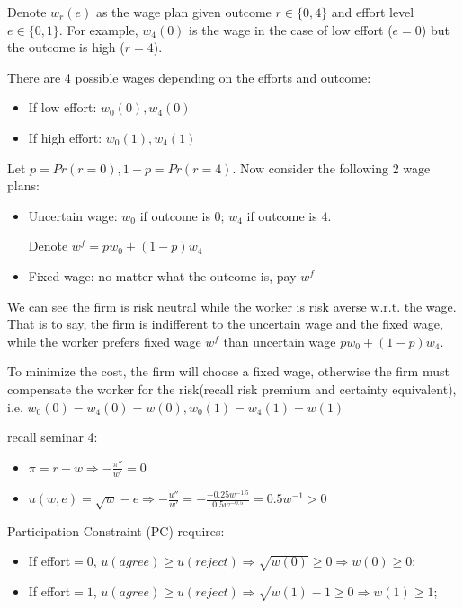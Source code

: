 \documentclass{article}
\begin{document}
\bigskip

Denote $w_r(e)$ as the wage plan given outcome $r \in \{0,4\}$
and effort level $e\in \{0,1\}$. For example, $w_4(0)$ is the wage in the case of low effort ($e=0$) but the outcome is high ($r=4$).

\medskip

There are 4 possible wages depending on the efforts and outcome:

\begin{itemize}
\item If low effort: $w_0(0),w_4(0)$
\item If high effort: $w_0(1),w_4(1)$
\end{itemize}

Let $p = Pr(r=0), 1-p = Pr(r=4)$. Now consider the following 2 wage plans:

\begin{itemize}
\item Uncertain wage: $w_0$ if outcome is $0$; $w_4$ if outcome is $4$.

Denote $w^f = pw_0 +(1-p)w_4$
\item Fixed wage: no matter what the outcome is, pay $w^f$
\end{itemize}


We can see the firm is risk neutral while the worker is risk averse w.r.t. the wage. That is to say, the firm is indifferent to the uncertain wage and the fixed wage, while the worker prefers fixed wage $w^f$ than uncertain wage $pw_0 +(1-p)w_4$.

\medskip

To minimize the cost, the firm will choose a fixed wage, otherwise the firm must compensate the worker for the risk(recall risk premium and certainty equivalent), i.e. $w_0(0)=w_4(0)=w(0), w_0(1)=w_4(1)=w(1)$

\begin{mdframed}[backgroundcolor=blue!20,linecolor=white]
recall seminar 4:
\begin{itemize}
\item  $\pi = r - w \Rightarrow -\frac{\pi''}{w'} = 0$
\item $u(w, e) = \sqrt{w} -e \Rightarrow -\frac{u''}{w'} = -\frac{-0.25w^{-1.5}}{0.5w^{-0.5}} = 0.5w^{-1}>0$
\end{itemize}
\end{mdframed}

Participation Constraint (PC) requires:

\begin{itemize}
\item If effort$=0$, $u(agree) \ge u(reject) \Rightarrow \sqrt{w(0)} \ge 0 \Rightarrow w(0) \ge 0$;
\item If effort$=1$, $u(agree) \ge u(reject) \Rightarrow \sqrt{w(1)} -1 \ge 0 \Rightarrow w(1) \ge 1$;
\end{itemize}
\end{document}
